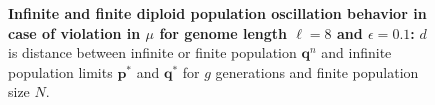 \begin{figure}[H]
\begin{center}
\hspace{5pt}
\hspace{5pt}


\caption{\textbf{Infinite and finite diploid population oscillation behavior in case of violation in $\mu$ for genome length $\ell = 8$ and $\epsilon = 0.1$:} $d$ is
  distance between infinite or finite population ${\bm q}^n$ and infinite
  population limits ${{\bm p}^\ast}$ and ${{\bm q}^{\ast}}$ for $g$ generations and finite population size $N$.}
\label{oscillation_8d_vio_mu_0.1}
\end{center}
\end{figure}

